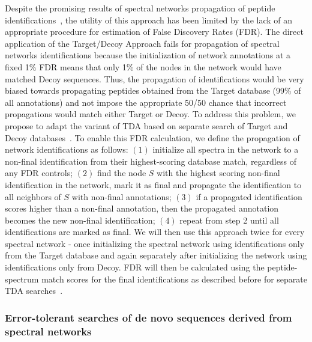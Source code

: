 \documentclass[arial,11pt]{article}
\begin{document}
Despite the promising results of spectral networks propagation of peptide identifications~\cite{bandeira07pnas,gonzalez10,yang11}, the utility of this approach has been limited by the lack of an appropriate procedure for estimation of False Discovery Rates (FDR). The direct application of the Target/Decoy Approach fails for propagation of spectral networks identifications because the initialization of network annotations at a fixed 1\% FDR means that only 1\% of the nodes in the network would have matched Decoy sequences. Thus, the propagation of identifications would be very biased towards propagating peptides obtained from the Target database (99\% of all annotations) and not impose the appropriate 50/50 chance that incorrect propagations would match either Target or Decoy. To address this problem, we propose to adapt the variant of TDA based on separate search of Target and Decoy databases~\cite{elias07}. To enable this FDR calculation, we define the propagation of network identifications as follows: %
$(1)$ initialize all spectra in the network to a non-final identification from their highest-scoring database match, regardless of any FDR controls;
%
$(2)$ find the node $S$ with the highest scoring non-final identification in the network, mark it as final and propagate the identification to all neighbors of $S$ with non-final annotations;
%
$(3)$ if a propagated identification scores higher than a non-final annotation, then the propagated annotation becomes the new non-final identification;
%
$(4)$ repeat from step 2 until all identifications are marked as final. We will then use this approach twice for every spectral network \-- once initializing the spectral network using identifications only from the Target database and again separately after initializing the network using identifications only from Decoy. FDR will then be calculated using the peptide-spectrum match scores for the final identifications as described before for separate TDA searches~\cite{elias07}.

\subsubsection{Error-tolerant searches of de novo sequences derived from spectral networks}
\label{trd.snets.aim.id.denovoDBsearch}
\end{document}
